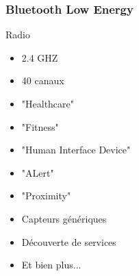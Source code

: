 \begin{frame}
	\frametitle{Bluetooth Low Energy}
	\begin{minipage}[t]{0.30\linewidth}
		\vspace{0.5cm}
		\begin{block}{Radio}
			\begin{itemize}
				\item 2.4 GHZ
				\item 40 canaux
			\end{itemize}
		\end{block}
	\end{minipage}
	\begin{minipage}[t]{0.66\linewidth}
		\vspace{0.5cm}
		\vspace{0.5cm}
		\begin{itemize}
			\item "Healthcare"
			\item "Fitness"
			\item "Human Interface Device"
			\item "ALert"
			\item "Proximity"
			\item Capteurs génériques
			\item Découverte de services
			\item Et bien plus...
		\end{itemize}
	\end{minipage}
\end{frame}

